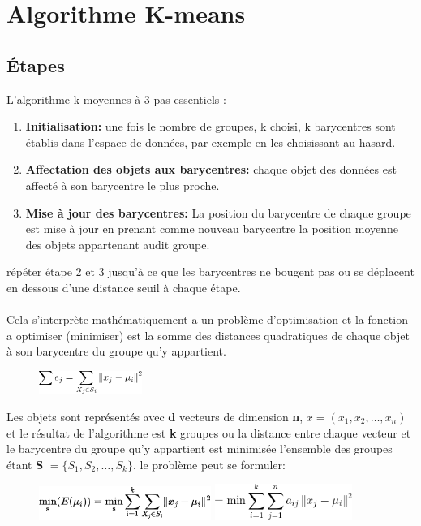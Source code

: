 \documentclass[a4paper,12pt]{report}
\begin{document}
\section{Algorithme K-means}
\subsection{\'Etapes}
L'algorithme k-moyennes à 3 pas essentiels :


\begin{enumerate}
    \item \textbf{Initialisation: }une fois le nombre de groupes, k choisi, k barycentres sont établis dans l'espace de données, par exemple en les choisissant au hasard.
    \item \textbf{Affectation des objets aux barycentres: }chaque objet des données est affecté à son barycentre le plus proche.
    \item \textbf{Mise à jour des barycentres: }La position du barycentre de chaque groupe est mise à jour en prenant comme nouveau barycentre la position moyenne des objets appartenant audit groupe.
\end{enumerate}


répéter étape 2 et 3 jusqu'à ce que les barycentres ne bougent pas ou se déplacent en dessous d'une distance seuil à chaque étape.\\\\
Cela s'interprète mathématiquement a un problème d'optimisation et la fonction a optimiser (minimiser) est la somme des distances quadratiques de chaque objet à son barycentre du groupe qu'y appartient.

\begin{figure}[!ht]
    \centering
    \includegraphics[width=0.3\textwidth]{CodeCogsEqn.png}
    \label{fig:equation1}
\end{figure}

Les objets sont représentés avec \textbf{d} vecteurs de dimension \textbf{n},  $x = (x_1,x_2,…,x_n)$ et le résultat de l'algorithme est \textbf{k} groupes ou la distance entre chaque vecteur et le barycentre 
du groupe qu'y appartient est minimisée l'ensemble des groupes étant \textbf{S} $= \{S_1,S_2,…,S_k\}.$
le problème peut se formuler:

\begin{figure}[h]
    \centering
    \includegraphics[width=0.5\textwidth]{equation.png}
    \includegraphics[width=0.4\textwidth]{suiteOfEquation.png}
    \label{fig:equation2}
\end{figure}
\end{document}

